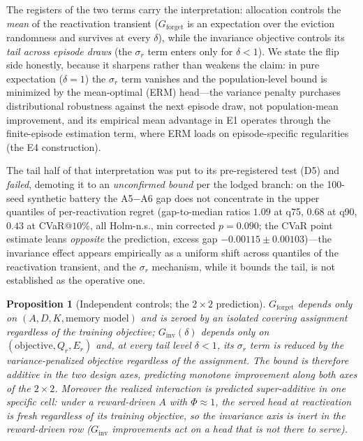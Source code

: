 \documentclass{article}
\newtheorem{proposition}{Proposition}
\newcommand{\Ginv}{G_{\mathrm{inv}}}
\newcommand{\Gforget}{G_{\mathrm{forget}}}
\begin{document}
The registers of the two terms carry the interpretation: allocation
controls the \emph{mean} of the reactivation transient ($\Gforget$ is an
expectation over the eviction randomness and survives at every
$\delta$), while the invariance objective controls its \emph{tail
across episode draws} (the $\sigma_r$ term enters only for
$\delta < 1$). We state the flip side honestly, because it sharpens
rather than weakens the claim: in pure expectation ($\delta = 1$) the
$\sigma_r$ term vanishes and the population-level bound is minimized by
the mean-optimal (ERM) head---the variance penalty purchases
distributional robustness against the next episode draw, not
population-mean improvement, and its empirical mean advantage in E1
operates through the finite-episode estimation term, where ERM loads on
episode-specific regularities (the E4 construction).

The tail half of that interpretation was put to its pre-registered
test (D5) and \emph{failed}, demoting it to an \emph{unconfirmed
bound} per the lodged branch: on the 100-seed synthetic battery the
A5$-$A6 gap does not concentrate in the upper quantiles of
per-reactivation regret (gap-to-median ratios $1.09$ at q75, $0.68$
at q90, $0.43$ at CVaR@$10\%$, all Holm-n.s., min corrected
$p = 0.090$; the CVaR point estimate leans \emph{opposite} the
prediction, excess gap $-0.00115 \pm 0.00103$)---the invariance
effect appears empirically as a uniform shift across quantiles of
the reactivation transient, and the $\sigma_r$ mechanism, while it
bounds the tail, is not established as the operative one.

\begin{proposition}[Independent controls; the $2{\times}2$ prediction]
\label{prop:additive}
$\Gforget$ depends only on $(A, D, K, \text{memory model})$ and is zeroed
by an isolated covering assignment regardless of the training
objective; $\Ginv(\delta)$ depends only on $(\text{objective}, Q_r, E_r)$
and, at every tail level $\delta < 1$, its $\sigma_r$ term is reduced by
the variance-penalized objective regardless of the assignment.
The bound is therefore additive in the two design axes, predicting monotone
improvement along both axes of the $2{\times}2$. Moreover the realized
interaction is predicted \emph{super-additive} in one specific cell: under
a reward-driven $A$ with $\Phi \approx 1$, the served head at reactivation
is fresh regardless of its training objective, so the invariance axis is
inert in the reward-driven row ($\Ginv$ improvements act on a head that is
not there to serve).
\end{proposition}
\end{document}
